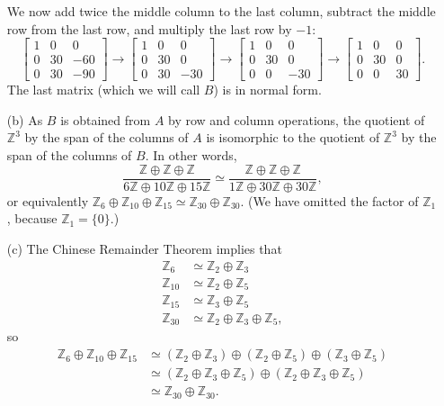 \documentclass{amsart}
\newcommand{\bbm}       {\left[\begin{matrix}}
\newcommand{\ebm}       {\end{matrix}\right]}
\newcommand{\Z}         {{\mathbb{Z}}}
\newcommand{\xra}       {\xrightarrow}
\newcommand{\op}        {\oplus}
\renewcommand{\:}{\colon}
\theoremstyle{definition}
\renewenvironment{solution}{\SolutionAtEnd}{\endSolutionAtEnd}
\begin{document}
\begin{solution}
\begin{itemize}
\[   \]
   We now add twice the middle column to the last column, subtract the
   middle row from the last row, and multiply the last row by $-1$:
   \[ \bbm 1&0&0\\0&30&-60\\0&30&-90\ebm \xra{}
      \bbm 1&0&0\\0&30&0\\0&30&-30\ebm \xra{}
      \bbm 1&0&0\\0&30&0\\0&0&-30\ebm \xra{}
      \bbm 1&0&0\\0&30&0\\0&0&30\ebm.
   \]
   The last matrix (which we will call $B$) is in normal form.
  \item[(b)]
   As $B$ is obtained from $A$ by row and column operations, the
   quotient of $\Z^3$ by the span of the columns of $A$ is isomorphic
   to the quotient of $\Z^3$ by the span of the columns of $B$.  In
   other words,
   \[ \frac{\Z\op\Z\op\Z}{6\Z\op 10\Z\op 15\Z} \simeq
      \frac{\Z\op\Z\op\Z}{1\Z\op 30\Z\op 30\Z},
   \]
   or equivalently $\Z_6\op\Z_{10}\op\Z_{15}\simeq\Z_{30}\op\Z_{30}$.
   (We have omitted the factor of $\Z_1$, because $\Z_1=\{0\}$.)
  \item[(c)] The Chinese Remainder Theorem implies that 
   \begin{align*}
    \Z_6    &\simeq \Z_2\op\Z_3 \\
    \Z_{10} &\simeq \Z_2\op\Z_5 \\
    \Z_{15} &\simeq \Z_3\op\Z_5 \\
    \Z_{30} &\simeq \Z_2\op\Z_3\op\Z_5,
   \end{align*}
   so
   \begin{align*}
    \Z_6\op\Z_{10}\op\Z_{15} &\simeq
      (\Z_2\op\Z_3)\op(\Z_2\op\Z_5)\op(\Z_3\op\Z_5) \\
    &\simeq (\Z_2\op\Z_3\op\Z_5)\op(\Z_2\op\Z_3\op\Z_5) \\
    &\simeq \Z_{30}\op\Z_{30}.
   \end{align*}
 \end{itemize}
\end{solution}
\end{document}

